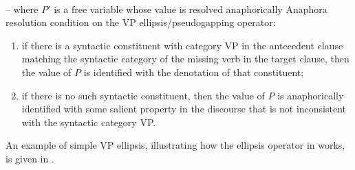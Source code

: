 \documentclass[output=paper,colorlinks,citecolor=brown]{langscibook}
\begin{document}
\begin{exe}
 \ex\label{ellipseOp1}
   \\

   -- where $P'$ is a free variable whose value is
  resolved anaphorically
 \ex\label{Acondition}
  Anaphora resolution condition on the VP ellipsis/pseudogapping
  operator:
  \begin{enumerate}
   \item
    if there is a syntactic  constituent
    with category VP in the antecedent clause matching the
    syntactic  category of the missing verb in the target clause,
    then the value of $P$ is identified with the denotation of that constituent;
   \item
    if there is no such syntactic  constituent, then the value of $P$  is anaphorically
    identified with some salient property in the discourse that is not
    inconsistent with the syntactic  category VP.
  \end{enumerate}
\end{exe}
An example of simple VP ellipsis, illustrating how the ellipsis operator
in  works, is given in .
\end{document}
